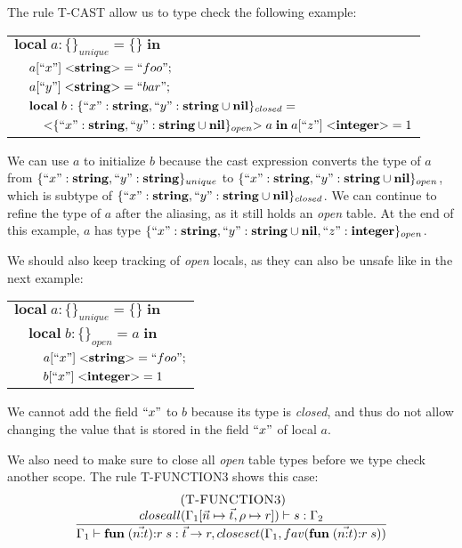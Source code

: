 The rule \textsc{T-CAST} allow us to type check the following example:
\begin{center}
\begin{tabular}{lll}
\multicolumn{3}{l}{$\mathbf{local} \; a:\{\}_{unique} = \{ \} \; \mathbf{in}$}\\
& \multicolumn{2}{l}{$a[``x"] \; {<}\mathbf{string}{>} = ``foo";$}\\
& \multicolumn{2}{l}{$a[``y"] \; {<}\mathbf{string}{>} = ``bar";$}\\
& \multicolumn{2}{l}{$\mathbf{local} \; b:\{``x":\mathbf{string}, ``y":\mathbf{string} \cup \mathbf{nil} \}_{closed} =$}\\
& & \multicolumn{1}{l}{${<}\{``x":\mathbf{string}, ``y":\mathbf{string} \cup \mathbf{nil}\}_{open}{>} \; a \; \mathbf{in} \; a[``z"] \; {<}\mathbf{integer}{>} = 1$}
\end{tabular}
\end{center}

We can use $a$ to initialize $b$ because the cast expression converts
the type of $a$ from $\{``x":\mathbf{string}, ``y":\mathbf{string}\}_{unique}$ to
$\{``x":\mathbf{string}, ``y":\mathbf{string} \cup \mathbf{nil}\}_{open}$, which is subtype of
$\{``x":\mathbf{string}, ``y":\mathbf{string} \cup \mathbf{nil}\}_{closed}$.
We can continue to refine the type of $a$ after the aliasing,
as it still holds an \emph{open} table.
At the end of this example, $a$ has type
$\{``x":\mathbf{string}, ``y":\mathbf{string} \cup \mathbf{nil}, ``z":\mathbf{integer}\}_{open}$.

We should also keep tracking of \emph{open} locals, as they can
also be unsafe like in the next example:
\begin{center}
\begin{tabular}{lll}
\multicolumn{3}{l}{$\mathbf{local} \; a:\{\}_{unique} = \{\} \; \mathbf{in}$}\\
& \multicolumn{2}{l}{$\mathbf{local} \; b:\{\}_{open} = a \; \mathbf{in}$}\\
& & \multicolumn{1}{l}{$a[``x"] \; {<}\mathbf{string}{>} = ``foo";$}\\
& & \multicolumn{1}{l}{$b[``x"] \; {<}\mathbf{integer}{>} = 1$}\\
\end{tabular}
\end{center}

We cannot add the field $``x"$ to $b$ because its type is \emph{closed},
and thus do not allow changing the value that is stored in the field $``x"$
of local $a$.

We also need to make sure to close all \emph{open} table types before we
type check another scope.
The rule \textsc{T-FUNCTION3} shows this case:
\[
\begin{array}{c}
\; (\textsc{T-FUNCTION3})\\
\dfrac{closeall(\Gamma_{1}[\vec{n} \mapsto \vec{t}, \rho \mapsto r]) \vdash s:\Gamma_{2}}
      {\Gamma_{1} \vdash \mathbf{fun} \; (\vec{n{:}t}){:}r \; s:\vec{t} \rightarrow r, closeset(\Gamma_{1}, fav(\mathbf{fun} \; (\vec{n{:}t}){:}r \; s))}
\end{array}
\]

